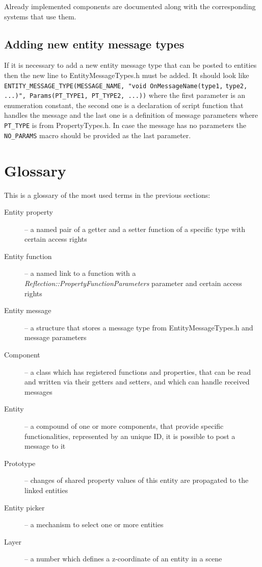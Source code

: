 Already implemented components are documented along with the corresponding systems that use them.

\subsection{Adding new entity message types}
\label{sub:entity-newmessages}

If it is necessary to add a new entity message type that can be posted to entities then the new line to EntityMessageTypes.h must be added. It should look like \verb/ENTITY_MESSAGE_TYPE(MESSAGE_NAME, "void OnMessageName(type1,/
\verb/type2, ...)", Params(PT_TYPE1, PT_TYPE2, ...))/ where the first parameter is an enumeration constant, the second one is a declaration of script function that handles the message and the last one is a definition of message parameters where \verb/PT_TYPE/ is from PropertyTypes.h. In case the message has no parameters the \verb/NO_PARAMS/ macro should be provided as the last parameter.

\section{Glossary}

This is a glossary of the most used terms in the previous sections:

\begin{description}
  \item[Entity property] -- a named pair of a getter and a setter function of a specific type with certain access rights
  \item[Entity function] -- a named link to a function with a \emph{Reflection::Property\-FunctionParameters} parameter and certain access rights
  \item[Entity message] -- a structure that stores a message type from EntityMessageTypes.h and message parameters
  \item[Component] -- a class which has registered functions and properties, that can be read and written via their getters and setters, and which can handle received messages
  \item[Entity] -- a compound of one or more components, that provide specific functionalities, represented by an unique ID, it is possible to post a message to it
  \item[Prototype] -- changes of shared property values of this entity are propagated to the linked entities
  \item[Entity picker] -- a mechanism to select one or more entities
  \item[Layer] -- a number which defines a z-coordinate of an entity in a scene
\end{description}